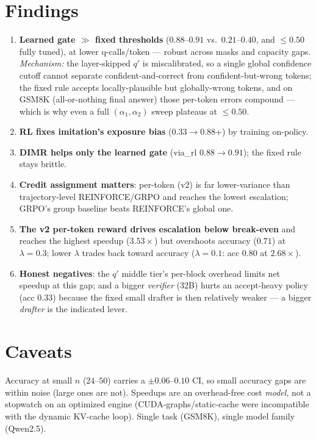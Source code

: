 \documentclass[11pt]{article}
\begin{document}
\section{Findings}
\begin{enumerate}\itemsep2pt
\item \textbf{Learned gate $\gg$ fixed thresholds} ($0.88$--$0.91$ vs.\ $0.21$--$0.40$, and $\le0.50$
fully tuned), at lower q-calls/token --- robust across masks and capacity gaps. \emph{Mechanism:} the
layer-skipped $q'$ is miscalibrated, so a single global confidence cutoff cannot separate
confident-and-correct from confident-but-wrong tokens; the fixed rule accepts locally-plausible but
globally-wrong tokens, and on GSM8K (all-or-nothing final answer) those per-token errors compound ---
which is why even a full $(\alpha_1,\alpha_2)$ sweep plateaus at $\le0.50$.
\item \textbf{RL fixes imitation's exposure bias} ($0.33\to0.88$+) by training on-policy.
\item \textbf{DIMR helps only the learned gate} (via\_rl $0.88\to0.91$); the fixed rule stays brittle.
\item \textbf{Credit assignment matters}: per-token (v2) is far lower-variance than trajectory-level
REINFORCE/GRPO and reaches the lowest escalation; GRPO's group baseline beats REINFORCE's global one.
\item \textbf{The v2 per-token reward drives escalation below break-even} and reaches the highest
speedup ($3.53\times$) but overshoots accuracy ($0.71$) at $\lambda{=}0.3$; lower $\lambda$ trades
back toward accuracy ($\lambda{=}0.1$: acc $0.80$ at $2.68\times$).
\item \textbf{Honest negatives}: the $q'$ middle tier's per-block overhead limits net speedup at
this gap; and a bigger \emph{verifier} (32B) hurts an accept-heavy policy (acc $0.33$) because the
fixed small drafter is then relatively weaker --- a bigger \emph{drafter} is the indicated lever.
\end{enumerate}

\section{Caveats}
Accuracy at small $n$ ($24$--$50$) carries a $\pm0.06$--$0.10$ CI, so small accuracy gaps are within
noise (large ones are not). Speedups are an overhead-free cost \emph{model}, not a stopwatch on an
optimized engine (CUDA-graphs/static-cache were incompatible with the dynamic KV-cache loop). Single
task (GSM8K), single model family (Qwen2.5).
\end{document}
